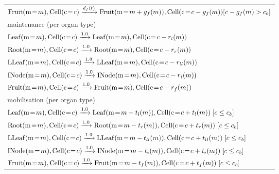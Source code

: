 \begin{figure}[p]
{\begin{tabularx}{1.3\textwidth}{l}
$\mathrm{Fruit}(\ar{m}{m}), \mathrm{Cell}(\ar{c}{c}) \xrightarrow{d_{f}(t)}
\mathrm{Fruit}(\ar{m}{m+g_{f}(m)}), \mathrm{Cell}(\ar{c}{c-g_{f}(m)}) [c-g_{f}(m) > c_b]$ \\

\textsf{maintenance (per organ type)} \\
\addlinespace[-0.1cm]
$\mathrm{Leaf}(\ar{m}{m}), \mathrm{Cell}(\ar{c}{c}) \xrightarrow{1.0}
\mathrm{Leaf}(\ar{m}{m}), \mathrm{Cell}(\ar{c}{c-r_{l}(m)})$ \\

$\mathrm{Root}(\ar{m}{m}), \mathrm{Cell}(\ar{c}{c}) \xrightarrow{1.0}
\mathrm{Root}(\ar{m}{m}), \mathrm{Cell}(\ar{c}{c-r_{r}(m)})$ \\

$\mathrm{LLeaf}(\ar{m}{m}), \mathrm{Cell}(\ar{c}{c}) \xrightarrow{1.0}
\mathrm{LLeaf}(\ar{m}{m}), \mathrm{Cell}(\ar{c}{c-r_{ll}(m)})$ \\

$\mathrm{INode}(\ar{m}{m}), \mathrm{Cell}(\ar{c}{c}) \xrightarrow{1.0}
\mathrm{INode}(\ar{m}{m}), \mathrm{Cell}(\ar{c}{c-r_{i}(m)})$ \\

$\mathrm{Fruit}(\ar{m}{m}), \mathrm{Cell}(\ar{c}{c}) \xrightarrow{1.0}
\mathrm{Fruit}(\ar{m}{m}), \mathrm{Cell}(\ar{c}{c-r_{f}(m)})$ \\

\textsf{mobilisation (per organ type)} \\
\addlinespace[-0.1cm]
$\mathrm{Leaf}(\ar{m}{m}), \mathrm{Cell}(\ar{c}{c}) \xrightarrow{1.0}
\mathrm{Leaf}(\ar{m}{m-t_{l}(m)}), \mathrm{Cell}(\ar{c}{c+t_{l}(m)})
\; [c \leq c_b]$ \\

$\mathrm{Root}(\ar{m}{m}), \mathrm{Cell}(\ar{c}{c}) \xrightarrow{1.0}
\mathrm{Root}(\ar{m}{m-t_{r}(m)}), \mathrm{Cell}(\ar{c}{c+t_{r}(m)})
\; [c \leq c_b]$ \\

$\mathrm{LLeaf}(\ar{m}{m}), \mathrm{Cell}(\ar{c}{c}) \xrightarrow{1.0}
\mathrm{LLeaf}(\ar{m}{m-t_{ll}(m)}), \mathrm{Cell}(\ar{c}{c+t_{ll}(m)})
\; [c \leq c_b]$ \\

$\mathrm{INode}(\ar{m}{m}), \mathrm{Cell}(\ar{c}{c}) \xrightarrow{1.0}
\mathrm{INode}(\ar{m}{m-t_{i}(m)}), \mathrm{Cell}(\ar{c}{c+t_{i}(m)})
\; [c \leq c_b]$ \\

$\mathrm{Fruit}(\ar{m}{m}), \mathrm{Cell}(\ar{c}{c}) \xrightarrow{1.0}
\mathrm{Fruit}(\ar{m}{m-t_{f}(m)}), \mathrm{Cell}(\ar{c}{c+t_{f}(m)}) \;
[c \leq c_b]$ \\


\end{tabularx}}
\end{figure}
